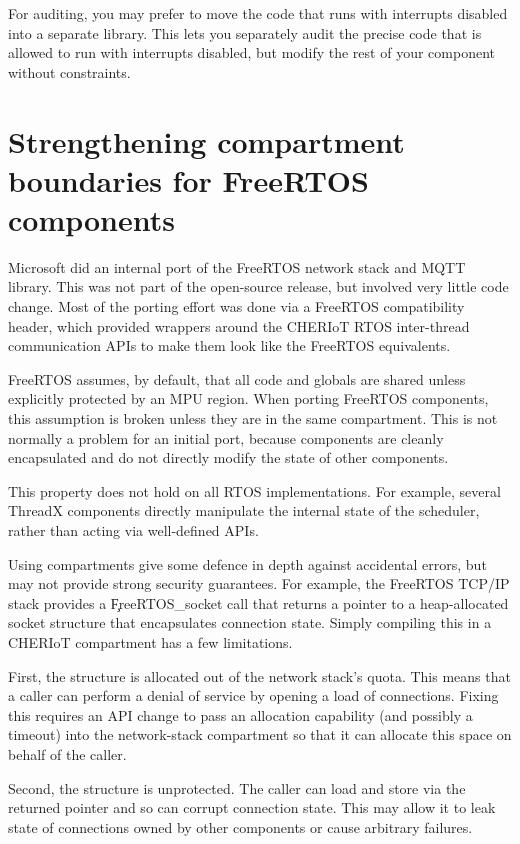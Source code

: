 For auditing, you may prefer to move the code that runs with interrupts disabled into a separate library.
This lets you separately audit the precise code that is allowed to run with interrupts disabled, but modify the rest of your component without constraints.

\section{Strengthening compartment boundaries for FreeRTOS components }

Microsoft did an internal port of the FreeRTOS network stack and MQTT library.
This was not part of the open-source release, but involved very little code change.
Most of the porting effort was done via a FreeRTOS compatibility header, which provided wrappers around the CHERIoT RTOS inter-thread communication APIs to make them look like the FreeRTOS equivalents.

FreeRTOS assumes, by default, that all code and globals are shared unless explicitly protected by an MPU region.
When porting FreeRTOS components, this assumption is broken unless they are in the same compartment.
This is not normally a problem for an initial port, because components are cleanly encapsulated and do not directly modify the state of other components.

\begin{note}
This property does not hold on all RTOS implementations.
For example, several ThreadX components directly manipulate the internal state of the scheduler, rather than acting via well-defined APIs.
\end{note}

Using compartments give some defence in depth against accidental errors, but may not provide strong security guarantees.
For example, the FreeRTOS TCP/IP stack provides a \c{FreeRTOS_socket} call that returns a pointer to a heap-allocated socket structure that encapsulates connection state.
Simply compiling this in a CHERIoT compartment has a few limitations.

First, the structure is allocated out of the network stack's quota.
This means that a caller can perform a denial of service by opening a load of connections.
Fixing this requires an API change to pass an allocation capability (and possibly a timeout) into the network-stack compartment so that it can allocate this space on behalf of the caller.

Second, the structure is unprotected.
The caller can load and store via the returned pointer and so can corrupt connection state.
This may allow it to leak state of connections owned by other components or cause arbitrary failures.

